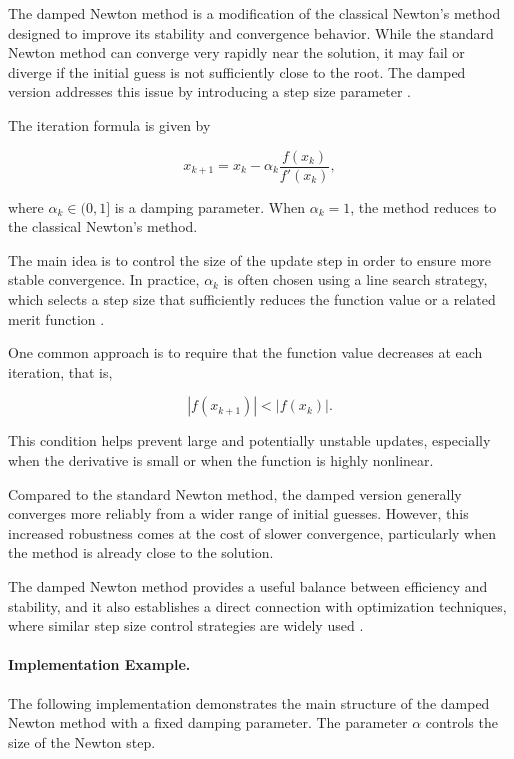 The damped Newton method is a modification of the classical Newton's method designed to improve its stability and convergence behavior. While the standard Newton method can converge very rapidly near the solution, it may fail or diverge if the initial guess is not sufficiently close to the root. The damped version addresses this issue by introducing a step size parameter \cite{kelley, chapra}.

The iteration formula is given by

\begin{equation}
x_{k+1} = x_k - \alpha_k \frac{f(x_k)}{f'(x_k)},
\end{equation}

where \( \alpha_k \in (0,1] \) is a damping parameter. When \( \alpha_k = 1 \), the method reduces to the classical Newton's method.

The main idea is to control the size of the update step in order to ensure more stable convergence. In practice, \( \alpha_k \) is often chosen using a line search strategy, which selects a step size that sufficiently reduces the function value or a related merit function \cite{kelley}.

One common approach is to require that the function value decreases at each iteration, that is,

\begin{equation}
|f(x_{k+1})| < |f(x_k)|.
\end{equation}

This condition helps prevent large and potentially unstable updates, especially when the derivative is small or when the function is highly nonlinear.

Compared to the standard Newton method, the damped version generally converges more reliably from a wider range of initial guesses. However, this increased robustness comes at the cost of slower convergence, particularly when the method is already close to the solution.

The damped Newton method provides a useful balance between efficiency and stability, and it also establishes a direct connection with optimization techniques, where similar step size control strategies are widely used \cite{nocedal}.

\paragraph{Implementation Example.}

The following implementation demonstrates the main structure of the damped Newton method with a fixed damping parameter. The parameter \(\alpha\) controls the size of the Newton step.

